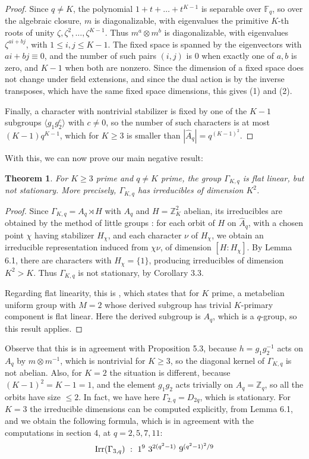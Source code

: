\documentclass[12pt]{amsart}
\newtheorem{theorem}{Theorem}[section]
\theoremstyle{definition}
\begin{document}
\begin{proof}
Since $q\neq K$, the polynomial $1+t+\ldots+t^{K-1}$ is separable over $\mathbb F_q$, so over the algebraic closure, $m$ is diagonalizable, with eigenvalues the primitive $K$-th roots of unity $\zeta,\zeta^2,\ldots,\zeta^{K-1}$. Thus $m^a\otimes m^b$ is diagonalizable, with eigenvalues $\zeta^{ai+bj}$, with $1\leq i,j\leq K-1$. The fixed space is spanned by the eigenvectors with $ai+bj\equiv0$, and the number of such pairs $(i,j)$ is $0$ when exactly one of $a,b$ is zero, and $K-1$ when both are nonzero. Since the dimension of a fixed space does not change under field extensions, and since the dual action is by the inverse transposes, which have the same fixed space dimensions, this gives (1) and (2).

Finally, a character with nontrivial stabilizer is fixed by one of the $K-1$ subgroups $\langle g_1g_2^c\rangle$ with $c\neq0$, so the number of such characters is at most $(K-1)q^{K-1}$, which for $K\geq3$ is smaller than $|\widehat{A}_q|=q^{(K-1)^2}$.
\end{proof}

With this, we can now prove our main negative result:

\begin{theorem}
For $K\geq3$ prime and $q\neq K$ prime, the group $\Gamma_{K,q}$ is flat linear, but not stationary. More precisely, $\Gamma_{K,q}$ has irreducibles of dimension $K^2$.
\end{theorem}

\begin{proof}
Since $\Gamma_{K,q}=A_q\rtimes H$ with $A_q$ and $H=\mathbb Z_K^2$ abelian, its irreducibles are obtained by the method of little groups \cite{ser}: for each orbit of $H$ on $\widehat{A}_q$, with a chosen point $\chi$ having stabilizer $H_\chi$, and each character $\nu$ of $H_\chi$, we obtain an irreducible representation induced from $\chi\nu$, of dimension $[H:H_\chi]$. By Lemma 6.1, there are characters with $H_\chi=\{1\}$, producing irreducibles of dimension $K^2>K$. Thus $\Gamma_{K,q}$ is not stationary, by Corollary 3.3.

Regarding flat linearity, this is \cite[Theorem 5.6]{bc2}, which states that for $K$ prime, a metabelian uniform group with $M=2$ whose derived subgroup has trivial $K$-primary component is flat linear. Here the derived subgroup is $A_q$, which is a $q$-group, so this result applies.
\end{proof}

Observe that this is in agreement with Proposition 5.3, because $h=g_1g_2^{-1}$ acts on $A_q$ by $m\otimes m^{-1}$, which is nontrivial for $K\geq3$, so the diagonal kernel of $\Gamma_{K,q}$ is not abelian. Also, for $K=2$ the situation is different, because $(K-1)^2=K-1=1$, and the element $g_1g_2$ acts trivially on $A_q=\mathbb Z_q$, so all the orbits have size $\leq2$. In fact, we have here $\Gamma_{2,q}=D_{2q}$, which is stationary. For $K=3$ the irreducible dimensions can be computed explicitly, from Lemma 6.1, and we obtain the following formula, which is in agreement with the computations in section 4, at $q=2,5,7,11$:
$${\rm Irr}(\Gamma_{3,q})\ :\ 1^9\ 3^{2(q^2-1)}\ 9^{(q^2-1)^2/9}$$
\end{document}
